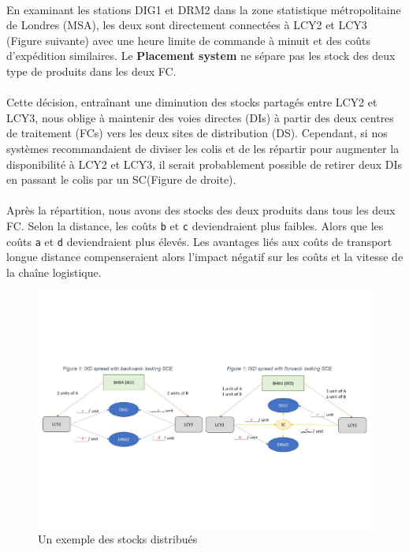 \paragraph{}
\vspace{-2em}
En examinant les stations DIG1 et DRM2 dans la zone statistique métropolitaine de Londres (MSA), les deux sont directement connectées à LCY2 et LCY3 (Figure suivante) avec une heure limite de commande à minuit et des coûts d'expédition similaires. 
Le \textbf{Placement system} ne sépare pas les stock des deux type de produits dans les deux FC. 

\paragraph{}
\vspace{-2em}
Cette décision, entraînant une diminution des stocks partagés entre LCY2 et LCY3, nous oblige à maintenir des voies directes (DIs) à partir des deux centres de traitement (FCs) vers les deux sites de distribution (DS). Cependant, si nos systèmes recommandaient de diviser les colis et de les répartir pour augmenter la disponibilité à LCY2 et LCY3, il serait probablement possible de retirer deux DIs en passant le colis par un SC(Figure de droite).

\paragraph{}
\vspace{-2em}
Après la répartition, nous avons des stocks des deux produits dans tous les deux FC. Selon la distance, les coûts \texttt{b} et \texttt{c} deviendraient plus faibles. Alors que les coûts \texttt{a} et \texttt{d} deviendraient plus élevés. Les avantages liés aux coûts de transport longue distance compenseraient alors l'impact négatif sur les coûts et la vitesse de la chaîne logistique.

\begin{figure}[htbp]
    \centering
    \includegraphics[width=0.8\linewidth]{./Graphismes-UTC/logos/Amazon/mobius schema 1.pdf}\hfill
    \caption{Un exemple des stocks distribués \cite{alignment}}
\end{figure}

